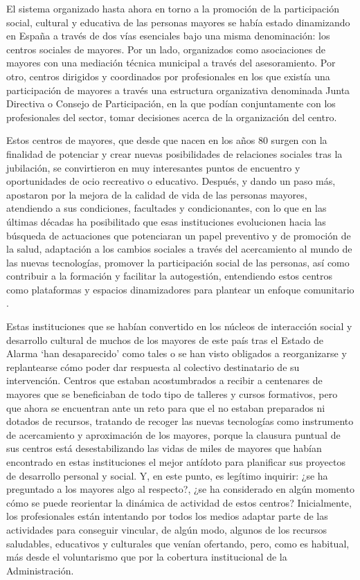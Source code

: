 \documentclass[spanish]{textolivre}
\begin{document}
El sistema organizado hasta ahora en torno a la promoción de la participación social, cultural y educativa de las personas mayores se había estado dinamizando en España a través de dos vías esenciales bajo una misma denominación: los centros sociales de mayores. Por un lado, organizados como asociaciones de mayores con una mediación técnica municipal a través del asesoramiento. Por otro, centros dirigidos y coordinados por profesionales en los que existía una participación de mayores a través una estructura organizativa denominada Junta Directiva o Consejo de Participación, en la que podían conjuntamente con los profesionales del sector, tomar decisiones acerca de la organización del centro.

Estos centros de mayores, que desde que nacen en los años 80 surgen con la finalidad de potenciar y crear nuevas posibilidades de relaciones sociales tras la jubilación, se convirtieron en muy interesantes puntos de encuentro y oportunidades de ocio recreativo o educativo. Después, y dando un paso más, apostaron por la mejora de la calidad de vida de las personas mayores, atendiendo a sus condiciones, facultades y condicionantes, con lo que en las últimas décadas ha posibilitado que esas instituciones evolucionen hacia las búsqueda de actuaciones que potenciaran un papel preventivo y de promoción de la salud, adaptación a los cambios sociales a través del acercamiento al mundo de las nuevas tecnologías, promover la participación social de las personas, así como contribuir a la formación y facilitar la autogestión, entendiendo estos centros como plataformas y espacios dinamizadores para plantear un enfoque comunitario \cite{martinezdemiguel2016}. %

Estas instituciones que se habían convertido en los núcleos de interacción social y desarrollo cultural de muchos de los mayores de este país tras el Estado de Alarma ‘han desaparecido’ como tales o se han visto obligados a reorganizarse y replantearse cómo poder dar respuesta al colectivo destinatario de su intervención. Centros que estaban acostumbrados a recibir a centenares de mayores que se beneficiaban de todo tipo de talleres y cursos formativos, pero que ahora se encuentran ante un reto para que el no estaban preparados ni dotados de recursos, tratando de recoger las nuevas tecnologías como instrumento de acercamiento y aproximación de los mayores, porque la clausura puntual de sus centros está desestabilizando las vidas de miles de mayores que habían encontrado en estas instituciones el mejor antídoto para planificar sus proyectos de desarrollo personal y social. Y, en este punto, es legítimo inquirir: ¿se ha preguntado a los mayores algo al respecto?, ¿se ha considerado en algún momento cómo se puede reorientar la dinámica de actividad de estos centros? Inicialmente, los profesionales están intentando por todos los medios adaptar parte de las actividades para conseguir vincular, de algún modo, algunos de los recursos saludables, educativos y culturales que venían ofertando, pero, como es habitual, más desde el voluntarismo que por la cobertura institucional de la Administración.
\end{document}
